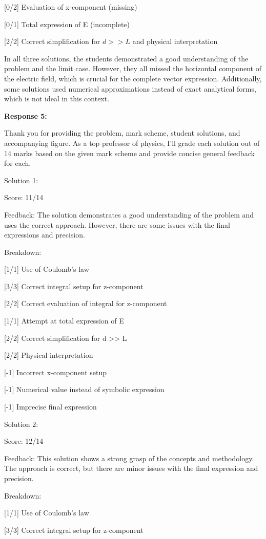 \documentclass[a4paper,11pt]{article}
\begin{document}
[0/2] Evaluation of x-component (missing)

[0/1] Total expression of E (incomplete)

[2/2] Correct simplification for \(d >> L\) and physical interpretation

In all three solutions, the students demonstrated a good understanding of the problem and the limit case. However, they all missed the horizontal component of the electric field, which is crucial for the complete vector expression. Additionally, some solutions used numerical approximations instead of exact analytical forms, which is not ideal in this context.

\bigskip
\textbf{Response 5:}

Thank you for providing the problem, mark scheme, student solutions, and accompanying figure. As a top professor of physics, I'll grade each solution out of 14 marks based on the given mark scheme and provide concise general feedback for each.

Solution 1:

Score: 11/14

Feedback: The solution demonstrates a good understanding of the problem and uses the correct approach. However, there are some issues with the final expressions and precision.

Breakdown:

[1/1] Use of Coulomb's law

[3/3] Correct integral setup for z-component

[2/2] Correct evaluation of integral for z-component

[1/1] Attempt at total expression of E

[2/2] Correct simplification for d >> L

[2/2] Physical interpretation

[-1] Incorrect x-component setup

[-1] Numerical value instead of symbolic expression

[-1] Imprecise final expression

Solution 2:

Score: 12/14

Feedback: This solution shows a strong grasp of the concepts and methodology. The approach is correct, but there are minor issues with the final expression and precision.

Breakdown:

[1/1] Use of Coulomb's law

[3/3] Correct integral setup for z-component
\end{document}
